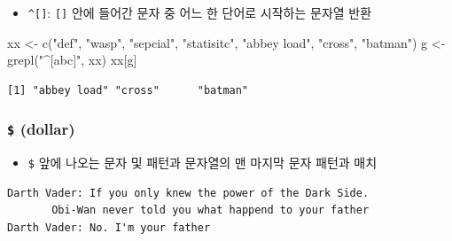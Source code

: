 \documentclass[
  11pt,
]{krantz}
\newenvironment{Shaded}{\begin{snugshade}}{\end{snugshade}}
\newcommand{\FunctionTok}[1]{\textcolor[rgb]{0,0,0}{#1}}
\newcommand{\NormalTok}[1]{#1}
\newcommand{\OtherTok}[1]{\textcolor[rgb]{0.37,0.37,0.37}{#1}}
\newcommand{\StringTok}[1]{\textcolor[rgb]{0.5,0.5,0.5}{#1}}
\providecommand{\tightlist}{%
  \setlength{\itemsep}{0pt}\setlength{\parskip}{0pt}}
\begin{document}
\begin{itemize}
\tightlist
\item
  \texttt{\^{}{[}{]}}: \texttt{{[}{]}} 안에 들어간 문자 중 어느 한 단어로 시작하는 문자열 반환
\end{itemize}

\footnotesize

\begin{Shaded}
\begin{Highlighting}[]
\NormalTok{xx }\OtherTok{\textless{}{-}} \FunctionTok{c}\NormalTok{(}\StringTok{"def"}\NormalTok{, }\StringTok{"wasp"}\NormalTok{, }\StringTok{"sepcial"}\NormalTok{, }\StringTok{"statisitc"}\NormalTok{, }\StringTok{"abbey load"}\NormalTok{, }\StringTok{"cross"}\NormalTok{, }\StringTok{"batman"}\NormalTok{)}
\NormalTok{g }\OtherTok{\textless{}{-}} \FunctionTok{grepl}\NormalTok{(}\StringTok{"\^{}[abc]"}\NormalTok{, xx)}
\NormalTok{xx[g]}
\end{Highlighting}
\end{Shaded}

\begin{verbatim}
[1] "abbey load" "cross"      "batman"    
\end{verbatim}

\normalsize

\hypertarget{dollar}{%
\subsubsection*{\texorpdfstring{\textbf{\texttt{\$} (dollar)}}{\$ (dollar)}}\label{dollar}}


\begin{itemize}
\tightlist
\item
  \texttt{\$} 앞에 나오는 문자 및 패턴과 문자열의 맨 마지막 문자 패턴과 매치
\end{itemize}

\footnotesize

\begin{Shaded}
\end{Shaded}

\begin{verbatim}
Darth Vader: If you only knew the power of the Dark Side. 
       Obi-Wan never told you what happend to your father
Darth Vader: No. I'm your father
\end{verbatim}
\end{document}
